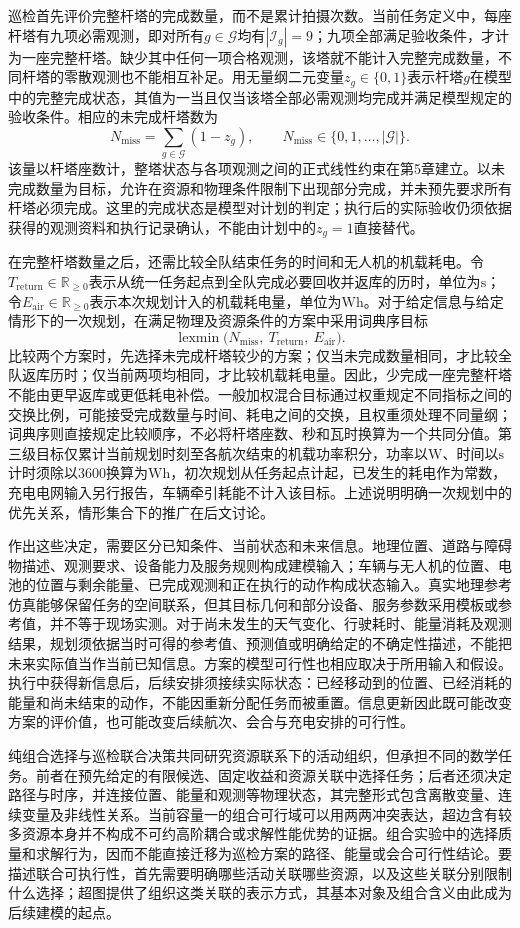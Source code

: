 巡检首先评价完整杆塔的完成数量，而不是累计拍摄次数。当前任务定义中，每座杆塔有九项必需观测，即对所有$g\in\mathcal{G}$均有$|\mathcal{I}_g|=9$；九项全部满足验收条件，才计为一座完整杆塔。缺少其中任何一项合格观测，该塔就不能计入完整完成数量，不同杆塔的零散观测也不能相互补足。用无量纲二元变量$z_g\in\{0,1\}$表示杆塔$g$在模型中的完整完成状态，其值为一当且仅当该塔全部必需观测均完成并满足模型规定的验收条件。相应的未完成杆塔数为
\begin{equation}
 N_{\mathrm{miss}}=\sum_{g\in\mathcal{G}}(1-z_g),
 \qquad
 N_{\mathrm{miss}}\in\{0,1,\ldots,|\mathcal{G}|\}.
 \label{s0101:uncompleted_towers}
\end{equation}
该量以杆塔座数计，整塔状态与各项观测之间的正式线性约束在第5章建立。以未完成数量为目标，允许在资源和物理条件限制下出现部分完成，并未预先要求所有杆塔必须完成。这里的完成状态是模型对计划的判定；执行后的实际验收仍须依据获得的观测资料和执行记录确认，不能由计划中的$z_g=1$直接替代。

在完整杆塔数量之后，还需比较全队结束任务的时间和无人机的机载耗电。令$T_{\mathrm{return}}\in\mathbb{R}_{\geq 0}$表示从统一任务起点到全队完成必要回收并返库的历时，单位为$\mathrm{s}$；令$E_{\mathrm{air}}\in\mathbb{R}_{\geq 0}$表示本次规划计入的机载耗电量，单位为$\mathrm{Wh}$。对于给定信息与给定情形下的一次规划，在满足物理及资源条件的方案中采用词典序目标
\begin{equation}
 \operatorname{lexmin}
 \bigl(N_{\mathrm{miss}},\ T_{\mathrm{return}},\ E_{\mathrm{air}}\bigr).
 \label{s0101:lexicographic_objective}
\end{equation}
比较两个方案时，先选择未完成杆塔较少的方案；仅当未完成数量相同，才比较全队返库历时；仅当前两项均相同，才比较机载耗电量。因此，少完成一座完整杆塔不能由更早返库或更低耗电补偿。一般加权混合目标通过权重规定不同指标之间的交换比例，可能接受完成数量与时间、耗电之间的交换，且权重须处理不同量纲；词典序则直接规定比较顺序，不必将杆塔座数、秒和瓦时换算为一个共同分值。第三级目标仅累计当前规划时刻至各航次结束的机载功率积分，功率以$\mathrm{W}$、时间以$\mathrm{s}$计时须除以$3600$换算为$\mathrm{Wh}$，初次规划从任务起点计起，已发生的耗电作为常数，充电电网输入另行报告，车辆牵引耗能不计入该目标。上述说明明确一次规划中的优先关系，情形集合下的推广在后文讨论。

作出这些决定，需要区分已知条件、当前状态和未来信息。地理位置、道路与障碍物描述、观测要求、设备能力及服务规则构成建模输入；车辆与无人机的位置、电池的位置与剩余能量、已完成观测和正在执行的动作构成状态输入。真实地理参考仿真能够保留任务的空间联系，但其目标几何和部分设备、服务参数采用模板或参考值，并不等于现场实测。对于尚未发生的天气变化、行驶耗时、能量消耗及观测结果，规划须依据当时可得的参考值、预测值或明确给定的不确定性描述，不能把未来实际值当作当前已知信息。方案的模型可行性也相应取决于所用输入和假设。执行中获得新信息后，后续安排须接续实际状态：已经移动到的位置、已经消耗的能量和尚未结束的动作，不能因重新分配任务而被重置。信息更新因此既可能改变方案的评价值，也可能改变后续航次、会合与充电安排的可行性。

纯组合选择与巡检联合决策共同研究资源联系下的活动组织，但承担不同的数学任务。前者在预先给定的有限候选、固定收益和资源关联中选择任务；后者还须决定路径与时序，并连接位置、能量和观测等物理状态，其完整形式包含离散变量、连续变量及非线性关系。当前容量一的组合可行域可以用两两冲突表达，超边含有较多资源本身并不构成不可约高阶耦合或求解性能优势的证据。组合实验中的选择质量和求解行为，因而不能直接迁移为巡检方案的路径、能量或会合可行性结论。要描述联合可执行性，首先需要明确哪些活动关联哪些资源，以及这些关联分别限制什么选择；超图提供了组织这类关联的表示方式，其基本对象及组合含义由此成为后续建模的起点。
